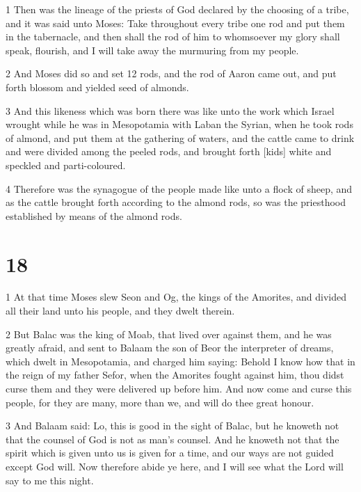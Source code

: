 \par 1 Then was the lineage of the priests of God declared by the choosing of a tribe, and it was said unto Moses: Take throughout every tribe one rod and put them in the tabernacle, and then shall the rod of him to whomsoever my glory shall speak, flourish, and I will take away the murmuring from my people. 

\par 2 And Moses did so and set 12 rods, and the rod of Aaron came out, and put forth blossom and yielded seed of almonds. 

\par 3 And this likeness which was born there was like unto the work which Israel wrought while he was in Mesopotamia with Laban the Syrian, when he took rods of almond, and put them at the gathering of waters, and the cattle came to drink and were divided among the peeled rods, and brought forth [kids] white and speckled and parti-coloured. 

\par 4 Therefore was the synagogue of the people made like unto a flock of sheep, and as the cattle brought forth according to the almond rods, so was the priesthood established by means of the almond rods.

\chapter{18}

\par 1 At that time Moses slew Seon and Og, the kings of the Amorites, and divided all their land unto his people, and they dwelt therein. 

\par 2 But Balac was the king of Moab, that lived over against them, and he was greatly afraid, and sent to Balaam the son of Beor the interpreter of dreams, which dwelt in Mesopotamia, and charged him saying: Behold I know how that in the reign of my father Sefor, when the Amorites fought against him, thou didst curse them and they were delivered up before him. And now come and curse this people, for they are many, more than we, and will do thee great honour. 

\par 3 And Balaam said: Lo, this is good in the sight of Balac, but he knoweth not that the counsel of God is not as man's counsel. And he knoweth not that the spirit which is given unto us is given for a time, and our ways are not guided except God will. Now therefore abide ye here, and I will see what the Lord will say to me this night. 

